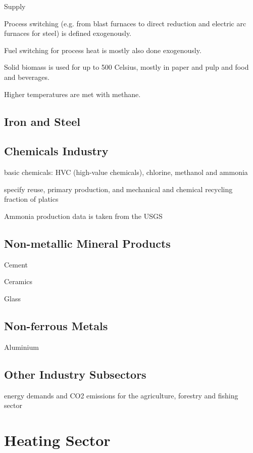Supply

Process switching (e.g. from blast furnaces to direct reduction and electric arc furnaces for steel) is defined exogenously.

Fuel switching for process heat is mostly also done exogenously.

Solid biomass is used for up to 500 Celsius, mostly in paper and pulp and food and beverages.

Higher temperatures are met with methane.

\subsection{Iron and Steel}

\subsection{Chemicals Industry}

basic chemicals: HVC (high-value chemicals), chlorine, methanol and ammonia

specify reuse, primary production, and mechanical and chemical recycling fraction of platics

Ammonia production data is taken from the USGS

\subsection{Non-metallic Mineral Products}

Cement

Ceramics

Glass

\subsection{Non-ferrous Metals}

Aluminium

\subsection{Other Industry Subsectors}

energy demands and CO2 emissions for the agriculture, forestry and fishing sector

\section{Heating Sector}

